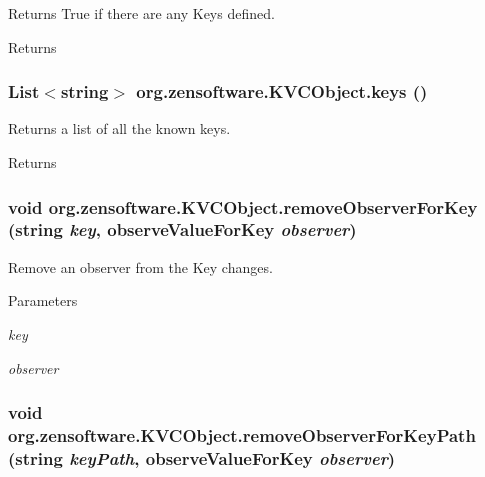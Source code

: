 Returns True if there are any Keys defined. \begin{DoxyReturn}{Returns}

\end{DoxyReturn}
\hypertarget{classorg_1_1zensoftware_1_1_k_v_c_object_ab9bf6eabd045ca108db9e7634c3208fc}{
\subsubsection[{keys}]{\setlength{\rightskip}{0pt plus 5cm}List$<$string$>$ org.zensoftware.KVCObject.keys ()}}
\label{classorg_1_1zensoftware_1_1_k_v_c_object_ab9bf6eabd045ca108db9e7634c3208fc}


Returns a list of all the known keys. \begin{DoxyReturn}{Returns}

\end{DoxyReturn}
\hypertarget{classorg_1_1zensoftware_1_1_k_v_c_object_abd9f01045119fff74ce9de7a3f31c104}{
\subsubsection[{removeObserverForKey}]{\setlength{\rightskip}{0pt plus 5cm}void org.zensoftware.KVCObject.removeObserverForKey (string {\em key}, \/  observeValueForKey {\em observer})}}
\label{classorg_1_1zensoftware_1_1_k_v_c_object_abd9f01045119fff74ce9de7a3f31c104}


Remove an observer from the Key changes. 
\begin{DoxyParams}{Parameters}
\item[{\em key}]\item[{\em observer}]\end{DoxyParams}
\hypertarget{classorg_1_1zensoftware_1_1_k_v_c_object_acd234b0a0f3327436fe5a98112f2b37f}{
\subsubsection[{removeObserverForKeyPath}]{\setlength{\rightskip}{0pt plus 5cm}void org.zensoftware.KVCObject.removeObserverForKeyPath (string {\em keyPath}, \/  observeValueForKey {\em observer})}}
\label{classorg_1_1zensoftware_1_1_k_v_c_object_acd234b0a0f3327436fe5a98112f2b37f}



